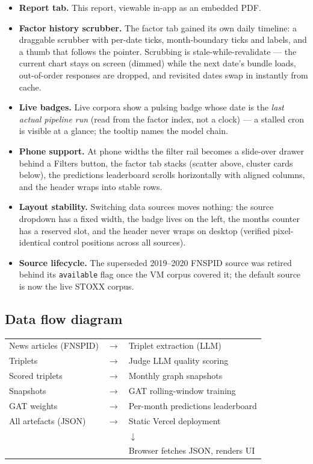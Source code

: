 \documentclass[11pt]{article}
\begin{document}
\begin{itemize}
  \item \textbf{Report tab.} This report, viewable in-app as an embedded PDF.
  \item \textbf{Factor history scrubber.} The factor tab gained its own daily timeline: a draggable scrubber with per-date ticks, month-boundary ticks and labels, and a thumb that follows the pointer. Scrubbing is stale-while-revalidate --- the current chart stays on screen (dimmed) while the next date's bundle loads, out-of-order responses are dropped, and revisited dates swap in instantly from cache.
  \item \textbf{Live badges.} Live corpora show a pulsing badge whose date is the \emph{last actual pipeline run} (read from the factor index, not a clock) --- a stalled cron is visible at a glance; the tooltip names the model chain.
  \item \textbf{Phone support.} At phone widths the filter rail becomes a slide-over drawer behind a Filters button, the factor tab stacks (scatter above, cluster cards below), the predictions leaderboard scrolls horizontally with aligned columns, and the header wraps into stable rows.
  \item \textbf{Layout stability.} Switching data sources moves nothing: the source dropdown has a fixed width, the badge lives on the left, the months counter has a reserved slot, and the header never wraps on desktop (verified pixel-identical control positions across all sources).
  \item \textbf{Source lifecycle.} The superseded 2019--2020 FNSPID source was retired behind its \texttt{available} flag once the VM corpus covered it; the default source is now the live STOXX corpus.
\end{itemize}

\subsection{Data flow diagram}
\begin{center}
\begin{tabular}{lcl}
News articles (FNSPID)      & \(\to\) & Triplet extraction (LLM) \\
Triplets                    & \(\to\) & Judge LLM quality scoring \\
Scored triplets             & \(\to\) & Monthly graph snapshots \\
Snapshots                   & \(\to\) & GAT rolling-window training \\
GAT weights                 & \(\to\) & Per-month predictions leaderboard \\
All artefacts (JSON)        & \(\to\) & Static Vercel deployment \\
                            &         & \(\downarrow\) \\
                            &         & Browser fetches JSON, renders UI \\
\end{tabular}
\end{center}
\end{document}
